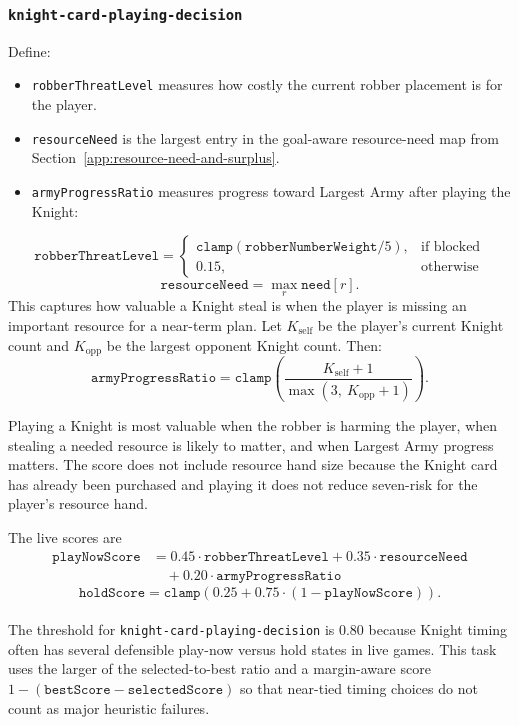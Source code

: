 \documentclass{article}
\begin{document}
\subsubsection{\texttt{knight-card-playing-decision}}
\label{app:task-knight-card-playing-decision}
Define:
\begin{itemize}
    \item \texttt{robberThreatLevel} measures how costly the current robber placement is for the player.
    \item \texttt{resourceNeed} is the largest entry in the goal-aware resource-need map from Section~\ref{app:resource-need-and-surplus}.
    \item \texttt{armyProgressRatio} measures progress toward Largest Army after playing the Knight:
\end{itemize}
\[
\texttt{robberThreatLevel} =
\begin{cases}
\texttt{clamp}(\texttt{robberNumberWeight} / 5), & \text{if blocked}\\
0.15, & \text{otherwise}
\end{cases}
\]
\[
\texttt{resourceNeed} = \max_r \texttt{need}[r].
\]
This captures how valuable a Knight steal is when the player is missing an important resource for a near-term plan.
Let $K_{\text{self}}$ be the player's current Knight count and $K_{\text{opp}}$ be the largest opponent Knight count. Then:
\[
\texttt{armyProgressRatio}
=
\texttt{clamp}\left(
\frac{K_{\text{self}} + 1}
{\max(3,\ K_{\text{opp}} + 1)}
\right).
\]

Playing a Knight is most valuable when the robber is harming the player, when stealing a needed resource is likely to matter, and when Largest Army progress matters. The score does not include resource hand size because the Knight card has already been purchased and playing it does not reduce seven-risk for the player's resource hand.

The live scores are
\[
\begin{aligned}
\texttt{playNowScore} &= 0.45 \cdot \texttt{robberThreatLevel} + 0.35 \cdot \texttt{resourceNeed} \\
&\quad + 0.20 \cdot \texttt{armyProgressRatio}
\end{aligned}
\]
\[
\texttt{holdScore} = \texttt{clamp}(0.25 + 0.75 \cdot (1 - \texttt{playNowScore})).
\]
\\
The threshold for \texttt{knight-card-playing-decision} is $0.80$ because Knight timing often has several defensible play-now versus hold states in live games. This task uses the larger of the selected-to-best ratio and a margin-aware score $1-(\texttt{bestScore}-\texttt{selectedScore})$ so that near-tied timing choices do not count as major heuristic failures.
\end{document}
